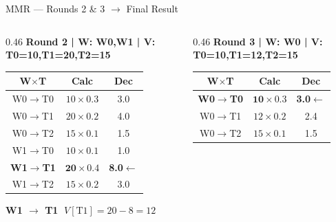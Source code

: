 \documentclass[aspectratio=169,10pt]{beamer}
\begin{document}
\begin{frame}{MMR --- Rounds 2 \& 3 $\rightarrow$ Final Result}
  \begin{columns}[T]
    \begin{column}{0.46\textwidth}
      \colorbox{navymidHex}{\color{teallt}\bfseries\small
        Round 2 | W: W0,W1 | V: T0=10,T1=20,T2=15}
      \vspace{3pt}

      \begin{tabular}{ccc}
        \toprule
        \rowcolor{navy}
          \color{white}\bfseries W$\times$T &
          \color{white}\bfseries Calc &
          \color{white}\bfseries Dec \\
        \midrule
        W0$\to$T0 & $10\times0.3$ & 3.0 \\
        W0$\to$T1 & $20\times0.2$ & 4.0 \\
        W0$\to$T2 & $15\times0.1$ & 1.5 \\
        W1$\to$T0 & $10\times0.1$ & 1.0 \\
        \rowcolor{lightyellow}
        \bfseries W1$\to$T1 & $\mathbf{20\times0.4}$ &
          \cellcolor{amber}\color{white}\bfseries 8.0$\leftarrow$ \\
        W1$\to$T2 & $15\times0.2$ & 3.0 \\
        \bottomrule
      \end{tabular}

      \vspace{4pt}
      {\small\bfseries\color{navydark} W1 $\to$ T1}
      {\small $\;V[\text{T1}]=20-8=12$}
    \end{column}

    \begin{column}{0.46\textwidth}
      \colorbox{navymidHex}{\color{teallt}\bfseries\small
        Round 3 | W: W0 | V: T0=10,T1=12,T2=15}
      \vspace{3pt}

      \begin{tabular}{ccc}
        \toprule
        \rowcolor{navy}
          \color{white}\bfseries W$\times$T &
          \color{white}\bfseries Calc &
          \color{white}\bfseries Dec \\
        \midrule
        \rowcolor{lightyellow}
        \bfseries W0$\to$T0 & $\mathbf{10\times0.3}$ &
          \cellcolor{amber}\color{white}\bfseries 3.0$\leftarrow$ \\
        W0$\to$T1 & $12\times0.2$ & 2.4 \\
        W0$\to$T2 & $15\times0.1$ & 1.5 \\
        \bottomrule
      \end{tabular}


\end{column}
\end{columns}
\end{frame}
\end{document}
